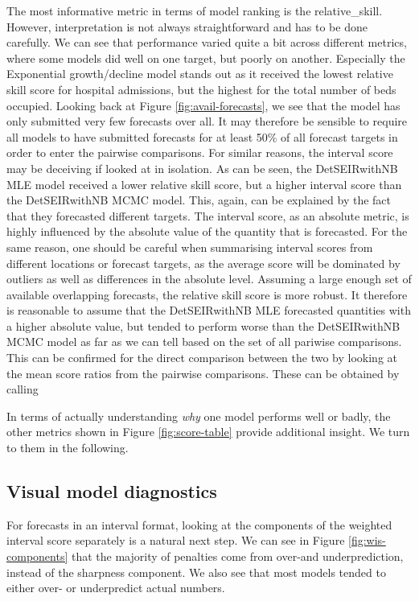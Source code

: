 \documentclass[article,shortnames]{jss}\usepackage[]{graphicx}\usepackage[]{color}
\begin{document}
The most informative metric in terms of model ranking is the relative\_skill. However, interpretation is not always straightforward and has to be done carefully. We can see that performance varied quite a bit across different metrics, where some models did well on one target, but poorly on another. Especially the Exponential growth/decline model stands out as it received the lowest relative skill score for hospital admissions, but the highest for the total number of beds occupied. Looking back at Figure \ref{fig:avail-forecasts}, we see that the model has only submitted very few forecasts over all. It may therefore be sensible to require all models to have submitted forecasts for at least 50\% of all forecast targets in order to enter the pairwise comparisons. For similar reasons, the interval score may be deceiving if looked at in isolation. As can be seen, the DetSEIRwithNB MLE model received a lower relative skill score, but a higher interval score than the DetSEIRwithNB MCMC model. This, again, can be explained by the fact that they forecasted different targets. The interval score, as an absolute metric, is highly influenced by the absolute value of the quantity that is forecasted. For the same reason, one should be careful when summarising interval scores from different locations or forecast targets, as the average score will be dominated by outliers as well as differences in the absolute level. Assuming a large enough set of available overlapping forecasts, the relative skill score is more robust. It therefore is reasonable to assume that the DetSEIRwithNB MLE forecasted quantities with a higher absolute value, but tended to perform worse than the DetSEIRwithNB MCMC model as far as we can tell based on the set of all pariwise comparisons. This can be confirmed for the direct comparison between the two by looking at the mean score ratios from the pairwise comparisons. These can be obtained by calling

In terms of actually understanding \textit{why} one model performs well or badly, the other metrics shown in Figure \ref{fig:score-table} provide additional insight. We turn to them in the following. 

\subsection{Visual model diagnostics}

For forecasts in an interval format, looking at the components of the weighted interval score separately is a natural next step. We can see in Figure \ref{fig:wis-components} that the majority of penalties come from over-and underprediction, instead of the sharpness component. We also see that most models tended to either over- or underpredict actual numbers.  
\end{document}
